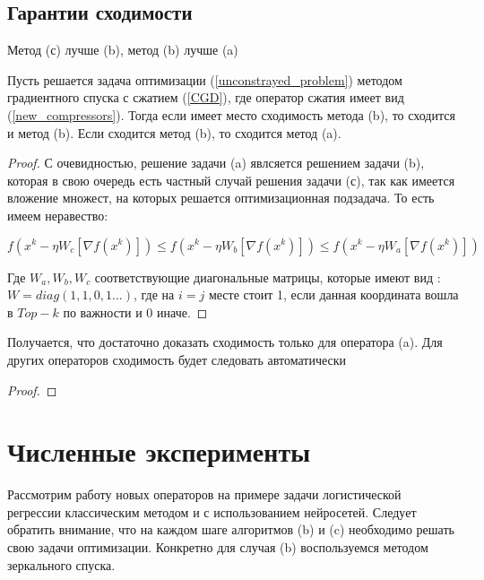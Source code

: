 \documentclass[12pt, twoside]{article}
\begin{document}
\subsection{Гарантии сходимости}
\begin{lemma}{Метод (с) лучше (b), метод (b) лучше (a)}

    Пусть решается задача оптимизации (\ref{unconstrayed_problem}) методом градиентного спуска с сжатием (\ref{CGD}), где оператор сжатия имеет вид (\ref{new_compressors}).
    Тогда если имеет место сходимость метода (b), то сходится и метод (b). Если сходится метод (b), то сходится метод (a). 
\end{lemma}
\begin{proof}

    С очевидностью, решение задачи (a) явлсяется решением задачи (b), которая в свою очередь есть частный случай решения задачи (с), так как имеется вложение множест, на которых решается оптимизационная подзадача. То есть имеем неравество: 

    $$f \left(x^k - \eta W_c\left[ \nabla f(x^k) \right] \right) \leq f \left(x^k - \eta W_b\left[ \nabla f(x^k) \right] \right) \leq f \left(x^k - \eta W_a\left[ \nabla f(x^k) \right] \right)$$

    Где $W_a, W_b, W_c$ соответствующие диагональные матрицы, которые имеют вид : $W = diag(1, 1, 0, 1 ...)$, где на $i=j$ месте стоит 1, если данная координата вошла в $Top-k$ по важности и 0 иначе.
\end{proof}
Получается, что достаточно доказать сходимость только для оператора (a). Для других операторов сходимость будет следовать автоматически
\begin{theorem}
    
\end{theorem}

\begin{proof}
    
\end{proof}

\section{Численные эксперименты}
Рассмотрим работу новых операторов на примере задачи логистической регрессии классическим методом и с использованием нейросетей. 
Следует обратить внимание, что на каждом шаге алгоритмов (b) и (c) необходимо решать свою задачи оптимизации. Конкретно для случая (b) воспользуемся методом зеркального спуска.
\end{document}
